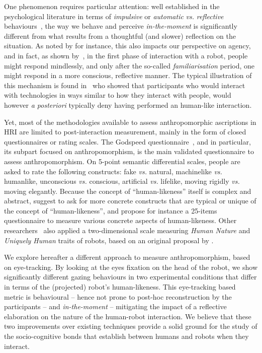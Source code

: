 \documentclass[lettersize, noapacite, twoside, HRI]{apa_HRI}
\newcommand{\vs}{\textit{vs.}\xspace}
\begin{document}
One phenomenon requires particular attention: well established in the
psychological literature in terms of \emph{impulsive} or \emph{automatic} \vs
\emph{reflective} behaviours~\citep{strack2004reflective}, the way we behave and
perceive \emph{in-the-moment} is significantly different from what results from
a thoughtful (and slower) reflection on the situation. As noted by
\citet{takayama_perspectives_2012} for instance, this also impacts our
perspective on agency, and in fact, as shown by~\citet{nass_machines_2000}, in
the first phase of interaction with a robot, people might respond mindlessly,
and only after the so-called \emph{familiarisation} period, one might respond in
a more conscious, reflective manner. The typical illustration of this mechanism
is found in~\citet{reeves_media_1996} who showed that participants who would
interact with technologies in ways similar to how they interact with people,
would however {\it a posteriori} typically deny having performed an human-like
interaction.

Yet, most of the methodologies available to assess anthropomorphic ascriptions
in HRI are limited to post-interaction measurement, mainly in the form of closed
questionnaires or rating scales. The Godspeed
questionnaire~\citep{bartneck_measurement_2008}, and in particular, its subpart
focused on anthropomorphism, is the main validated questionnaire to assess
anthropomorphism. On 5-point semantic differential scales, people are asked to
rate the following constructs: fake \vs natural, machinelike \vs humanlike,
unconscious \vs conscious, artificial \vs lifelike, moving rigidly \vs moving
elegantly. Because the concept of ``human-likeness'' itself is complex and
abstract, \citet{kahn_jr._robotic_2006} suggest to ask for more concrete
constructs that are typical or unique of the concept of ``human-likeness'', and
\citet{ruijten_introducing_2014} propose for instance a 25-items questionnaire to
measure various concrete aspects of human-likeness. Other
researchers~\citep{zlotowski2014dimensions,salem2015would} also applied a
two-dimensional scale measuring \emph{Human Nature} and \emph{Uniquely Human}
traits of robots, based on an original proposal by
\citet{haslam2008attributing}.

We explore hereafter a different approach to measure anthropomorphism, based on
eye-tracking. By looking at the eyes fixation on the head of the robot, we show
significantly different gazing behaviours in two experimental conditions that
differ in terms of the (projected) robot's human-likeness. This eye-tracking
based metric is behavioural -- hence not prone to post-hoc reconstruction by the
participants -- and \emph{in-the-moment} -- mitigating the impact of a reflective
elaboration on the nature of the human-robot interaction. We believe that these
two improvements over existing techniques provide a solid ground for the study
of the socio-cognitive bonds that establish between humans and robots when they
interact.
\end{document}
